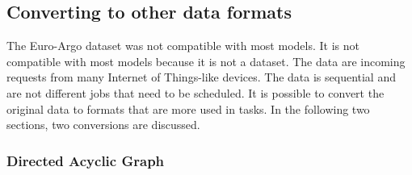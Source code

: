 

\subsection{Converting to other data formats}

The Euro-Argo dataset was not compatible with most models. It is not
compatible with most models because it is not a \jss dataset. The data are
incoming requests from many Internet of Things-like devices. The data is
sequential and are not different jobs that need to be scheduled. It is
possible to convert the original data to formats that are more used in \jss
tasks. In the following two sections, two conversions are discussed.


\subsubsection{Directed Acyclic Graph}\label{sec:dag}

